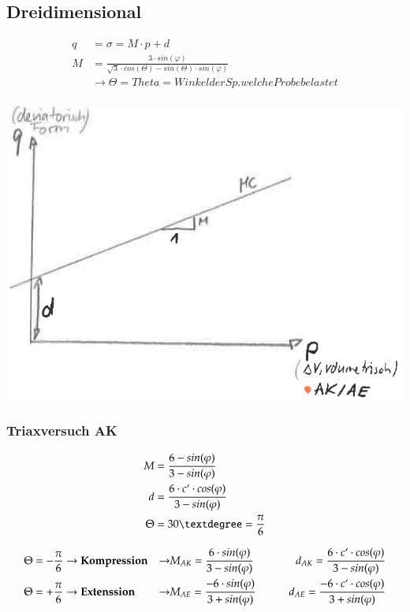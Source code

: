 	
\begin{minipage}{0.6\linewidth}
	\subsection{Dreidimensional}
	\begin{align*}
		q			&= \sigma = M \cdot p + d \\
		M			&= \frac{3 \cdot sin(\varphi)}{\sqrt{3} \cdot cos(\Theta) - sin(\Theta) \cdot sin(\varphi)} \\
					& \rightarrow \Theta = Theta =Winkel der Sp. welche Probe belastet\\
	\end{align*}
\end{minipage}
\begin{minipage}{0.4\linewidth}
\includegraphics[width=\linewidth]{images/MC33draum.PNG}
\end{minipage}


\begin{minipage}{0.3\linewidth}	
	\subsubsection{Triaxversuch AK}
	\begin{align*}
		M			&= \frac{6 - sin(\varphi)}{3 - sin(\varphi)} \\
		d			&= \frac{6 \cdot c`\cdot cos(\varphi)}{3 - sin(\varphi)} \\
		\Theta		&= 30° = \frac{\pi}{6} \\
	\end{align*}
\end{minipage}
\begin{minipage}{0.5\linewidth}
	\begin{align*}
		\Theta		&= - \frac{\pi}{6}
		\rightarrow \textbf{Kompression}
		&\rightarrow &M_{AK} = \frac{6 \cdot sin(\varphi)}{3 - sin(\varphi)}
		\qquad &d_{AK} = \frac{6 \cdot c`\cdot cos(\varphi)}{3 - sin(\varphi)} \\
		\Theta		&= + \frac{\pi}{6}
		\rightarrow \textbf{Extenssion}
		&\rightarrow &M_{AE} = \frac{- 6 \cdot sin(\varphi)}{3 + sin(\varphi)}
		\qquad &d_{AE} = \frac{- 6 \cdot c`\cdot cos(\varphi)}{3 + sin(\varphi)}
	\end{align*}
\end{minipage}

